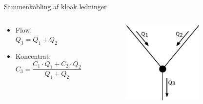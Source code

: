 \begin{frame}{Sammenkobling af kloak ledninger}{}
\vfill\vfill\centering
	\begin{columns}
	\begin{column}{0.4\textwidth}
		\begin{itemize}
			\vspace{9mm}
			\item<1-> Flow: \\ 
			\vspace{2mm}
			$Q_3 = Q_1 + Q_2$
			\vspace{9mm}
			\item<2-> Koncentrat: \\ 
			\vspace{3mm}
			$C_3 = \dfrac{C_1 \cdot Q_1 + C_2 \cdot Q_2}{Q_1 + Q_2}$
		\end{itemize}
	\end{column}

	\begin{column}{0.48\textwidth}
		\begin{figure}[H]
			\centering
			\includegraphics[width=0.7\textwidth]{Sections/pictures/interconnections.pdf}
		\end{figure}
	\end{column}
\end{columns}
\vfill\vfill		
\end{frame}

